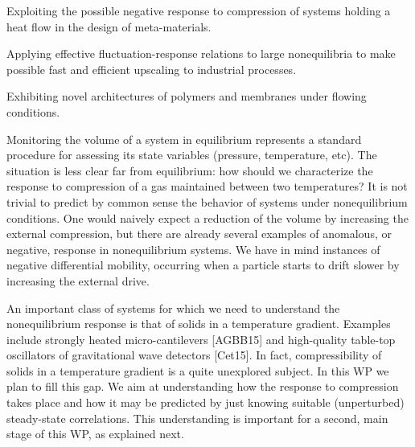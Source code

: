 \begin{workpackage}[id=WPcompress,wphases=0-48,
  short=Nonequilibrium compressibility, %
  title=Nonequilibrium compressibility, %
  lead=UNIPD,
  UNIPDRM=72,
  KULRM=12]


\begin{wpobjectives}
  \begin{compactitem}
  \item Exploiting the possible negative response to compression of systems holding a heat flow in the design of meta-materials.
  \item Applying effective fluctuation-response relations to large nonequilibria to make possible fast and efficient upscaling to industrial processes.
  \item Exhibiting novel architectures of polymers and membranes under flowing conditions. 
  \end{compactitem}
\end{wpobjectives}

\begin{wpdescription}

Monitoring the volume of a system in equilibrium represents a standard procedure for assessing its state 
variables (pressure, temperature, etc).
The situation is less clear far from equilibrium: 
how should we characterize the response to compression of a gas maintained between two temperatures?
It is not trivial to predict by common sense the behavior of systems under nonequilibrium conditions. 
One would naively expect a reduction of the volume by increasing the external compression, but there are already 
several examples of anomalous, or negative, response in nonequilibrium systems.
We have in mind instances of negative differential mobility, occurring when a particle starts to drift 
slower by increasing the external drive.

An important class of systems for which we need to understand the nonequilibrium response is that of solids 
in a temperature gradient. Examples include strongly
heated micro-cantilevers [AGBB15] and high-quality table-top oscillators of gravitational wave detectors [Cet15].
In fact, compressibility of solids in a temperature gradient is a quite unexplored subject.
In this WP we plan to fill this gap.
We aim at  understanding how the response to compression takes place and how it
may be predicted by just knowing suitable (unperturbed) steady-state correlations.
This understanding is important for a second, main stage of this WP, as explained next.



\end{wpdescription}
\end{workpackage}
